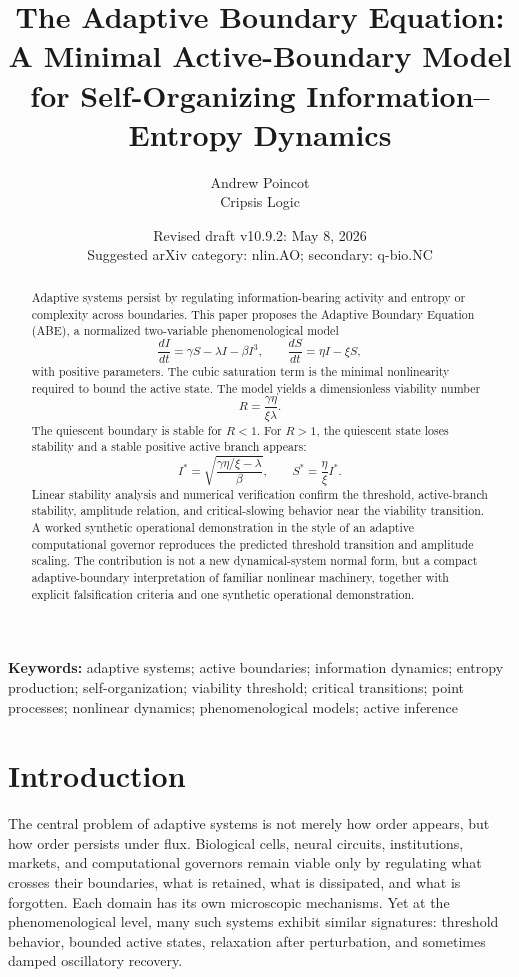 \documentclass[11pt]{article}
\title{\textbf{The Adaptive Boundary Equation:}\\
A Minimal Active-Boundary Model for Self-Organizing Information--Entropy Dynamics}
\author{Andrew Poincot\\Cripsis Logic}
\date{Revised draft v10.9.2: May 8, 2026\\Suggested arXiv category: nlin.AO; secondary: q-bio.NC}
\begin{document}
\maketitle

\begin{abstract}
Adaptive systems persist by regulating information-bearing activity and entropy or complexity across boundaries. This paper proposes the Adaptive Boundary Equation (ABE), a normalized two-variable phenomenological model
\begin{equation*}
\frac{dI}{dt}=\gamma S-\lambda I-\beta I^3,\qquad
\frac{dS}{dt}=\eta I-\xi S,
\end{equation*}
with positive parameters. The cubic saturation term is the minimal nonlinearity required to bound the active state. The model yields a dimensionless viability number
\begin{equation*}
R=\frac{\gamma\eta}{\xi\lambda}.
\end{equation*}
The quiescent boundary is stable for $R<1$. For $R>1$, the quiescent state loses stability and a stable positive active branch appears:
\begin{equation*}
I^*=\sqrt{\frac{\gamma\eta/\xi-\lambda}{\beta}},\qquad S^*=\frac{\eta}{\xi}I^*.
\end{equation*}
Linear stability analysis and numerical verification confirm the threshold, active-branch stability, amplitude relation, and critical-slowing behavior near the viability transition. A worked synthetic operational demonstration in the style of an adaptive computational governor reproduces the predicted threshold transition and amplitude scaling. The contribution is not a new dynamical-system normal form, but a compact adaptive-boundary interpretation of familiar nonlinear machinery, together with explicit falsification criteria and one synthetic operational demonstration.
\end{abstract}

\noindent\textbf{Keywords:} adaptive systems; active boundaries; information dynamics; entropy production; self-organization; viability threshold; critical transitions; point processes; nonlinear dynamics; phenomenological models; active inference

\clearpage
\section{Introduction}
The central problem of adaptive systems is not merely how order appears, but how order persists under flux. Biological cells, neural circuits, institutions, markets, and computational governors remain viable only by regulating what crosses their boundaries, what is retained, what is dissipated, and what is forgotten. Each domain has its own microscopic mechanisms. Yet at the phenomenological level, many such systems exhibit similar signatures: threshold behavior, bounded active states, relaxation after perturbation, and sometimes damped oscillatory recovery.
\end{document}
